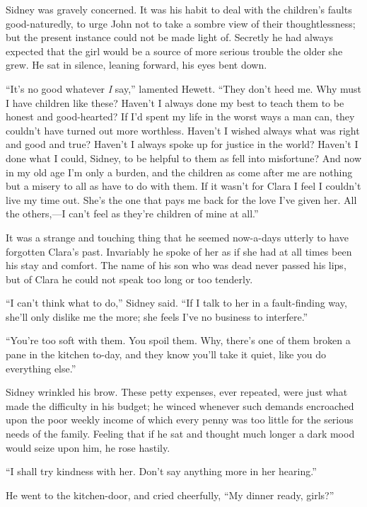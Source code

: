 Sidney was gravely concerned. It was his habit to deal with the
children's faults good-naturedly, to urge John not to take a sombre view
of their thoughtlessness; but the present instance could not be made
light of. Secretly he had always expected that the girl would be a
source of more serious trouble the older she grew. He sat in silence,
leaning forward, his eyes bent down.

``It's no good whatever \emph{I} say,'' lamented Hewett. ``They don't
heed me. Why must I have children like these? Haven't I always done my
best to teach them to be honest and good-hearted? If I'd spent my life
in the worst ways a man can, they couldn't have turned out more
worthless. Haven't I wished always what was right and good and true?
Haven't I always spoke up for justice in the {}world? Haven't I done
what I could, Sidney, to be helpful to them as fell into misfortune? And
now in my old age I'm only a burden, and the children as come after me
are nothing but a misery to all as have to do with them. If it wasn't
for Clara I feel I couldn't live my time out. She's the one that pays me
back for the love I've given her. All the others,---I can't feel as
they're children of mine at all.''

It was a strange and touching thing that he seemed now-a-days utterly to
have forgotten Clara's past. Invariably he spoke of her as if she had at
all times been his stay and comfort. The name of his son who was dead
never passed his lips, but of Clara he could not speak too long or too
tenderly.

``I can't think what to do,'' Sidney said. ``If I talk to her in a
fault-finding way, she'll only dislike me the more; she feels I've no
business to interfere.''

``You're too soft with them. You spoil them. Why, there's one of them
broken a pane in the kitchen to-day, and they know you'll take it quiet,
like you do everything else.''

Sidney wrinkled his brow. These petty expenses, ever repeated, were just
what made {}the difficulty in his budget; he winced whenever such
demands encroached upon the poor weekly income of which every penny was
too little for the serious needs of the family. Feeling that if he sat
and thought much longer a dark mood would seize upon him, he rose
hastily.

``I shall try kindness with her. Don't say anything more in her
hearing.''

He went to the kitchen-door, and cried cheerfully, ``My dinner ready,
girls?''

